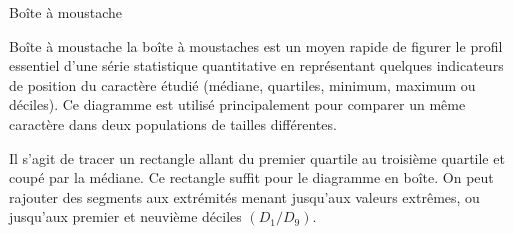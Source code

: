 \documentclass[10pt, french]{beamer}
\begin{document}
\begin{frame}{Boîte à moustache}
\begin{block}{Boîte à moustache}
la boîte à moustaches est un moyen rapide de figurer le profil essentiel d'une série statistique quantitative en représentant  quelques indicateurs de position du caractère étudié (médiane, quartiles, minimum, maximum ou déciles). Ce diagramme est utilisé principalement pour comparer un même caractère dans deux populations de tailles différentes.
\end{block}
Il s'agit de tracer un rectangle allant du premier quartile au troisième quartile et coupé par la médiane. Ce rectangle suffit pour le diagramme en boîte. On peut rajouter des segments aux extrémités menant jusqu'aux valeurs extrêmes, ou jusqu'aux premier et neuvième déciles $({\displaystyle D_{1}/D_{9}})$.
\end{frame}
\end{document}
